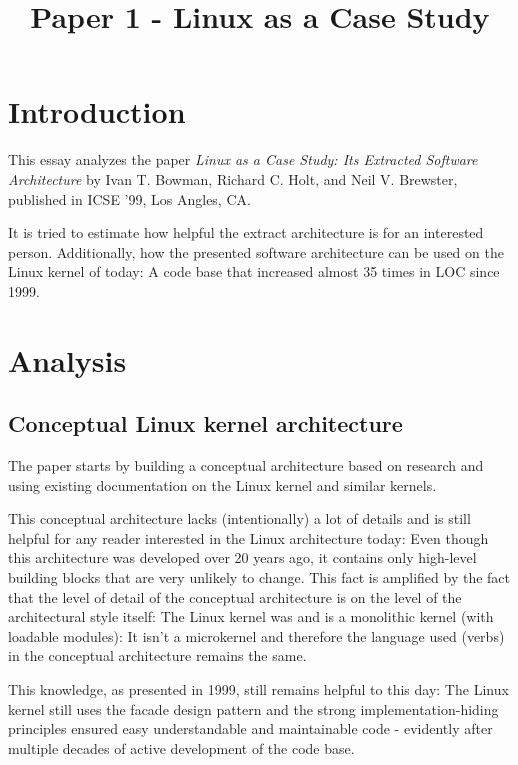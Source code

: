 \documentclass{article}
\title{Paper 1 - Linux as a Case Study}
\begin{document}
\makeheader


\section*{Introduction }

This essay analyzes the paper \textit{Linux as a Case Study: Its Extracted Software Architecture} by Ivan T. Bowman, Richard C. Holt, and Neil V. Brewster, published in ICSE '99, Los Angles, CA.

It is tried to estimate how helpful the extract architecture is for an interested person. Additionally, how the presented software architecture can be used on the Linux kernel of today: A code base that increased almost 35 times in LOC since 1999.

\section*{Analysis}


\subsection*{Conceptual Linux kernel architecture}


The paper starts by building a conceptual architecture based on research and using existing documentation on the Linux kernel and similar kernels.

This conceptual architecture lacks (intentionally) a lot of details and is still helpful for any reader interested in the Linux architecture today: Even though this architecture was developed over 20 years ago, it contains only high-level building blocks that are very unlikely to change. 
This fact is amplified by the fact that the level of detail of the conceptual architecture is on the level of the architectural style itself: The Linux kernel was and is a monolithic kernel (with loadable modules): It isn't a microkernel and therefore the language used (verbs) in the conceptual architecture remains the same.

This knowledge, as presented in 1999, still remains helpful to this day: The Linux kernel still uses the facade design pattern and the strong implementation-hiding principles ensured easy understandable and maintainable code - evidently after multiple decades of active development of the code base.
\end{document}
